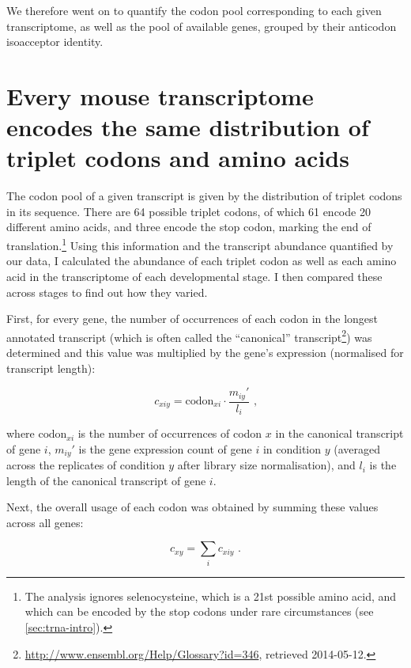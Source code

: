 We therefore went on to quantify the codon pool corresponding to each given
transcriptome, as well as the pool of available \trna genes, grouped by their
anticodon isoacceptor identity.

\section{Every mouse  transcriptome encodes the same distribution of
triplet codons and amino acids}

The codon pool of a given \mrna transcript is given by the distribution of
triplet codons in its sequence. There are \num{64} possible triplet codons, of
which \num{61} encode \num{20} different amino acids, and three encode the stop
codon, marking the end of translation.\footnote{The analysis ignores
selenocysteine, which is a \num{21}st possible amino acid, and which can be
encoded by the stop codons  under rare circumstances (see
\cref{sec:trna-intro}).} Using this information and the transcript abundance
quantified by our \rnaseq data, I calculated the abundance of each triplet codon
as well as each amino acid in the transcriptome of each developmental stage. I
then compared these across stages to find out how they varied.

First, for every gene, the number of occurrences of each codon in the longest
annotated transcript (which is often called the “canonical”
transcript\footnote{\url{http://www.ensembl.org/Help/Glossary?id=346}, retrieved
2014-05-12.}) was determined and this value was multiplied by the gene’s
expression (normalised for transcript length):

\begin{equation}
    c_{xiy} = \text{codon}_{xi} \cdot \frac{m_{iy}'}{l_{i}} \text{\ ,}
\end{equation}

where \(\text{codon}_{xi}\) is the number of occurrences of codon \(x\) in the
canonical transcript of gene \(i\), \(m_{iy}'\) is the gene expression count of
gene \(i\) in condition \(y\) (averaged across the replicates of condition \(y\)
after library size normalisation), and \(l_i\) is the length of the canonical
transcript of gene \(i\).

Next, the overall usage of each codon was obtained by summing these values
across all genes:

\begin{equation}
    c_{xy} = \sum_i c_{xiy} \text{\ .}
\end{equation}

